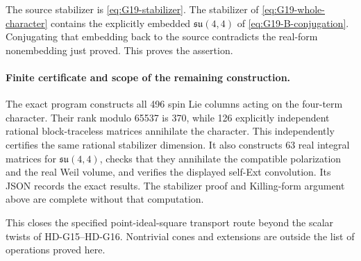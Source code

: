 The source stabilizer is \eqref{eq:G19-stabilizer}. The stabilizer of
\eqref{eq:G19-whole-character} contains the explicitly embedded
\(\mathfrak{su}(4,4)\) of \eqref{eq:G19-B-conjugation}. Conjugating
that embedding back to the source contradicts the real-form
nonembedding just proved. This proves the assertion.

\paragraph{Finite certificate and scope of the remaining construction.}
The exact program  constructs
all 496 spin Lie columns acting on the four-term character. Their rank
modulo 65537 is 370, while 126 explicitly independent rational
block-traceless matrices annihilate the character. This independently
certifies the same rational stabilizer dimension. It also constructs
63 real integral matrices for \(\mathfrak{su}(4,4)\), checks that
they annihilate the compatible polarization and the real Weil volume,
and verifies the displayed self-Ext convolution. Its JSON records the
exact results. The stabilizer proof and Killing-form argument above
are complete without that computation.

This closes the specified point-ideal-square transport route beyond
the scalar twists of HD-G15--HD-G16. Nontrivial cones and extensions
are outside the list of operations proved here.
